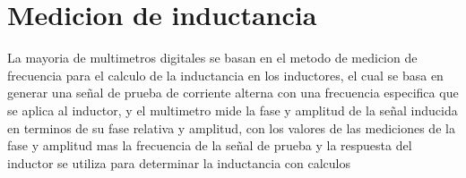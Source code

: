 \documentclass{article}
\begin{document}
\section{Medicion de inductancia }
La mayoria de multimetros digitales se basan en el metodo de medicion de frecuencia para el calculo de la inductancia en los inductores, el cual se basa en generar una señal de prueba de corriente alterna con una frecuencia especifica que se aplica al inductor, y el multimetro mide la fase y amplitud de la señal inducida en terminos de su fase relativa y amplitud, con los valores de las mediciones de la fase y amplitud mas la frecuencia de la señal de prueba y la respuesta del inductor se utiliza para determinar la inductancia con calculos 
\end{document}
